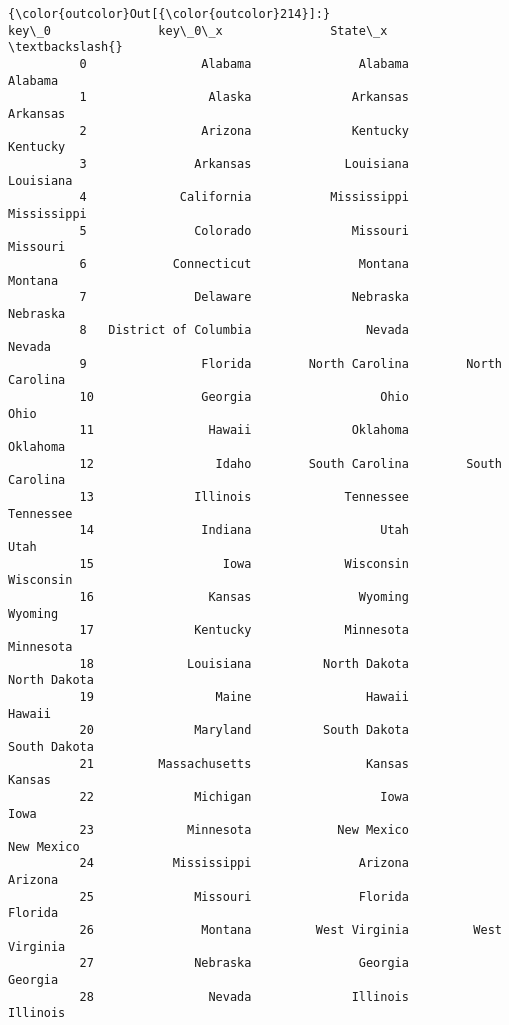 \documentclass[11pt]{article}
\begin{document}
\begin{Verbatim}[commandchars=\\\{\}]
{\color{outcolor}Out[{\color{outcolor}214}]:}                    key\_0               key\_0\_x               State\_x  \textbackslash{}
          0                Alabama               Alabama               Alabama   
          1                 Alaska              Arkansas              Arkansas   
          2                Arizona              Kentucky              Kentucky   
          3               Arkansas             Louisiana             Louisiana   
          4             California           Mississippi           Mississippi   
          5               Colorado              Missouri              Missouri   
          6            Connecticut               Montana               Montana   
          7               Delaware              Nebraska              Nebraska   
          8   District of Columbia                Nevada                Nevada   
          9                Florida        North Carolina        North Carolina   
          10               Georgia                  Ohio                  Ohio   
          11                Hawaii              Oklahoma              Oklahoma   
          12                 Idaho        South Carolina        South Carolina   
          13              Illinois             Tennessee             Tennessee   
          14               Indiana                  Utah                  Utah   
          15                  Iowa             Wisconsin             Wisconsin   
          16                Kansas               Wyoming               Wyoming   
          17              Kentucky             Minnesota             Minnesota   
          18             Louisiana          North Dakota          North Dakota   
          19                 Maine                Hawaii                Hawaii   
          20              Maryland          South Dakota          South Dakota   
          21         Massachusetts                Kansas                Kansas   
          22              Michigan                  Iowa                  Iowa   
          23             Minnesota            New Mexico            New Mexico   
          24           Mississippi               Arizona               Arizona   
          25              Missouri               Florida               Florida   
          26               Montana         West Virginia         West Virginia   
          27              Nebraska               Georgia               Georgia   
          28                Nevada              Illinois              Illinois   

\end{Verbatim}
\end{document}
